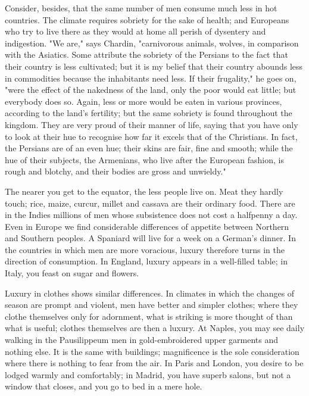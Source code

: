 \documentclass[12pt]{report}
\begin{document}
Consider, besides, that the same number of men consume much less in hot countries. The climate requires sobriety for the sake of health; and Europeans who try to live there as they would at home all perish of dysentery and indigestion. "We are," says Chardin, "carnivorous animals, wolves, in comparison with the Asiatics. Some attribute the sobriety of the Persians to the fact that their country is less cultivated; but it is my belief that their country abounds less in commodities because the inhabitants need less. If their frugality," he goes on, "were the effect of the nakedness of the land, only the poor would eat little; but everybody does so. Again, less or more would be eaten in various provinces, according to the land's fertility; but the same sobriety is found throughout the kingdom. They are very proud of their manner of life, saying that you have only to look at their hue to recognise how far it excels that of the Christians. In fact, the Persians are of an even hue; their skins are fair, fine and smooth; while the hue of their subjects, the Armenians, who live after the European fashion, is rough and blotchy, and their bodies are gross and unwieldy."

The nearer you get to the equator, the less people live on. Meat they hardly touch; rice, maize, curcur, millet and cassava are their ordinary food. There are in the Indies millions of men whose subsistence does not cost a halfpenny a day. Even in Europe we find considerable differences of appetite between Northern and Southern peoples. A Spaniard will live for a week on a German's dinner. In the countries in which men are more voracious, luxury therefore turns in the direction of consumption. In England, luxury appears in a well-filled table; in Italy, you feast on sugar and flowers.

Luxury in clothes shows similar differences. In climates in which the changes of season are prompt and violent, men have better and simpler clothes; where they clothe themselves only for adornment, what is striking is more thought of than what is useful; clothes themselves are then a luxury. At Naples, you may see daily walking in the Pausilippeum men in gold-embroidered upper garments and nothing else. It is the same with buildings; magnificence is the sole consideration where there is nothing to fear from the air. In Paris and London, you desire to be lodged warmly and comfortably; in Madrid, you have superb salons, but not a window that closes, and you go to bed in a mere hole.
\end{document}
